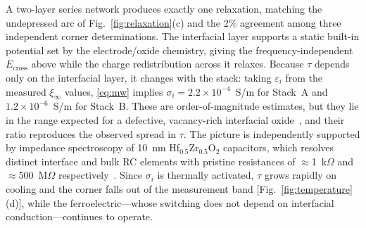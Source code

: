 \documentclass[journal]{IEEEtran}
\newcommand{\hzo}{Hf$_{0.5}$Zr$_{0.5}$O$_{2}$}
\newcommand{\Ecross}{E_{\mathrm{cross}}}
\begin{document}
A two-layer series network produces exactly one relaxation, matching the
undepressed arc of Fig.~\ref{fig:relaxation}(c) and the 2\% agreement among
three independent corner determinations. The interfacial layer supports a
static built-in potential set by the electrode/oxide chemistry, giving the
frequency-independent $\Ecross$ above while the charge redistribution across
it relaxes. Because $\tau$ depends only on the interfacial layer, it changes
with the stack: taking $\varepsilon_i$ from the measured $\xi_\infty$ values,
\eqref{eq:mw} implies $\sigma_i = 2.2\times10^{-4}$~S/m for Stack~A and
$1.2\times10^{-6}$~S/m for Stack~B. These are order-of-magnitude estimates,
but they lie in the range expected for a defective, vacancy-rich interfacial
oxide~\cite{kim2023vacancy,segantini2023strain,koroleva2022,iung2025}, and
their ratio reproduces the observed spread in $\tau$. The picture is
independently supported by impedance spectroscopy of 10~nm \hzo{} capacitors,
which resolves distinct interface and bulk RC elements with pristine
resistances of $\approx$1~k$\Omega$ and $\approx$500~M$\Omega$
respectively~\cite{alcala2023}. Since $\sigma_i$ is thermally activated,
$\tau$ grows rapidly on cooling and the corner falls out of the measurement
band [Fig.~\ref{fig:temperature}(d)], while the ferroelectric---whose
switching does not depend on interfacial conduction---continues to operate.
\end{document}
